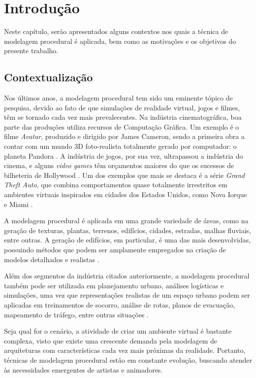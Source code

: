 \chapter{Introdução}
\label{cap:introducao}

Neste capítulo, serão apresentados alguns contextos nos quais a técnica de modelagem procedural é aplicada, bem como as motivações e os objetivos do presente trabalho.

\section{Contextualização}
\label{sec:contextualização}

Nos últimos anos, a modelagem procedural tem sido um eminente tópico de pesquisa, devido ao fato de que simulações de realidade virtual, jogos e filmes, têm se tornado cada vez mais prevalecentes. Na indústria cinematográfica, boa parte das produções utiliza recursos de Computação Gráfica. Um exemplo é o filme \textit{Avatar}, produzido e dirigido por James Cameron, sendo a primeira obra a contar com um mundo 3D foto-realista totalmente gerado por computador: o planeta Pandora \cite{simon2011}. A indústria de jogos, por sua vez, ultrapassou a indústria do cinema, e alguns \textit{video games} têm orçamentos maiores do que os sucessos de bilheteria de Hollywood \cite{teboul2011}. Um dos exemplos que mais se destaca é a série \textit{Grand Theft Auto}, que combina comportamentos quase totalmente irrestritos em ambientes virtuais inspirados em cidades dos Estados Unidos, como Nova Iorque e Miami \cite{simon2011}.

A modelagem procedural é aplicada em uma grande variedade de áreas, como na geração de texturas, plantas, terrenos, edifícios, cidades, estradas, malhas fluviais, entre outras. A geração de edifícios, em particular, é uma das mais desenvolvidas, possuindo métodos que podem ser amplamente empregados na criação de modelos detalhados e realistas \cite{smelik2014}. 

Além dos segmentos da indústria citados anteriormente, a modelagem procedural também pode ser utilizada em planejamento urbano, análises logísticas e simulações, uma vez que representações realistas de um espaço urbano podem ser aplicadas em treinamentos de socorro, análise de rotas, planos de evacuação, mapeamento de tráfego, entre outras situações \cite{francisco2014}.

Seja qual for o cenário, a atividade de criar um ambiente virtual é bastante complexa, visto que existe uma crescente demanda pela modelagem de arquiteturas com características cada vez mais próximas da realidade. Portanto, técnicas de modelagem procedural estão em constante evolução, buscando atender às necessidades emergentes de artistas e animadores.

